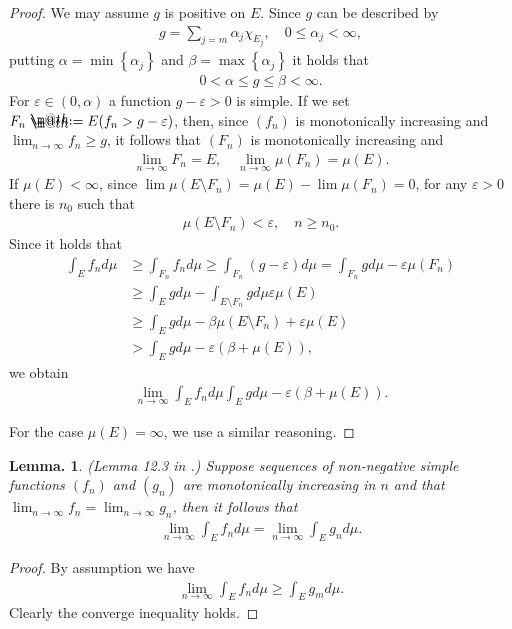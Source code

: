 \documentclass[openany, a4paper, oneside]{jsbook}
\makeatletter
\newcommand*{\defeq}{\mathrel{\rlap{%
\raisebox{0.3ex}{$\m@th\cdot$}}%
\raisebox{-0.3ex}{$\m@th\cdot$}}%
=}
\theoremstyle{break}
\newtheorem{lem}[thm]{Lemma.}
\theoremstyle{breakdefn}
\newcommand{\rbk}[1]{\left (#1\right)}
\newcommand{\cbk}[1]{\left\{#1\right\}}
\makeatother
\begin{document}
\begin{proof}
We may assume $g$ is positive on $E$.
Since $g$ can be described by
\begin{align}
 g
 =
 \sum_{j=m} \alpha_j \chi_{E_j}, \quad 0 \leq \alpha_j < \infty,
\end{align}
putting $\alpha = \min \cbk{\alpha_j}$ and $\beta = \max \cbk{\alpha_j}$ it holds that
\begin{align}
 0 < \alpha \leq g \leq \beta < \infty.
\end{align}
For $\varepsilon \in (0, \alpha)$ a function $g - \varepsilon > 0$ is simple.
If we set $F_n \defeq E (f_n > g - \varepsilon)$, then, since $(f_n)$ is monotonically increasing and $\lim_{n \to \infty} f_n \geq g$, it follows that
$(F_n)$ is monotonically increasing and
\begin{align}
 \lim_{n \to \infty} F_n = E, \quad
 \lim_{n \to \infty} \mu (F_n) = \mu (E).
\end{align}
If $\mu (E) < \infty$, since $\lim \mu (E \setminus F_n) = \mu (E) - \lim \mu (F_n) = 0$, for any $\varepsilon > 0$ there is $n_0$ such that
\begin{align}
 \mu \rbk{E \setminus F_n} < \varepsilon, \quad n \geq n_0.
\end{align}
Since it holds that
\begin{align}
 \int_E f_n d \mu
 &\geq \int_{F_n} f_n d \mu
 \geq
 \int_{F_n} (g - \varepsilon) d\mu
 =
 \int_{F_n} g d \mu - \varepsilon \mu (F_n) \\
 &\geq
 \int_E g d \mu - \int_{E \setminus F_n} g d \mu \varepsilon \mu (E) \\
 &\geq
 \int_E g d \mu - \beta \mu \rbk{E \setminus F_n} + \varepsilon \mu (E) \\
 &>
 \int_E g d \mu - \varepsilon \rbk{ \beta + \mu (E)},
\end{align}
we obtain
\begin{align}
 \lim_{n \to \infty} \int_E f_n d \mu
 \int_E g d\mu - \varepsilon \rbk{\beta + \mu (E)}.
\end{align}

For the case $\mu (E) = \infty$, we use a similar reasoning.
\end{proof}

\begin{lem}\textup{(Lemma 12.3 in \cite{SeizoIto1}.)}
 Suppose sequences of non-negative simple functions $(f_n)$ and $(g_n)$ are monotonically increasing in $n$
 and that $\lim_{n \to \infty} f_n = \lim_{n \to \infty} g_n$, then it follows that
 \begin{align}
  \lim_{n \to \infty} \int_E f_n d \mu
  =
  \lim_{n \to \infty} \int_E g_n d \mu.
 \end{align}
\end{lem}
\begin{proof}
By assumption we have
\begin{align}
 \lim_{n \to \infty} \int_E f_n d\mu
 \geq
 \int_E g_m d \mu.
\end{align}
Clearly the converge inequality holds.
\end{proof}
\end{document}
